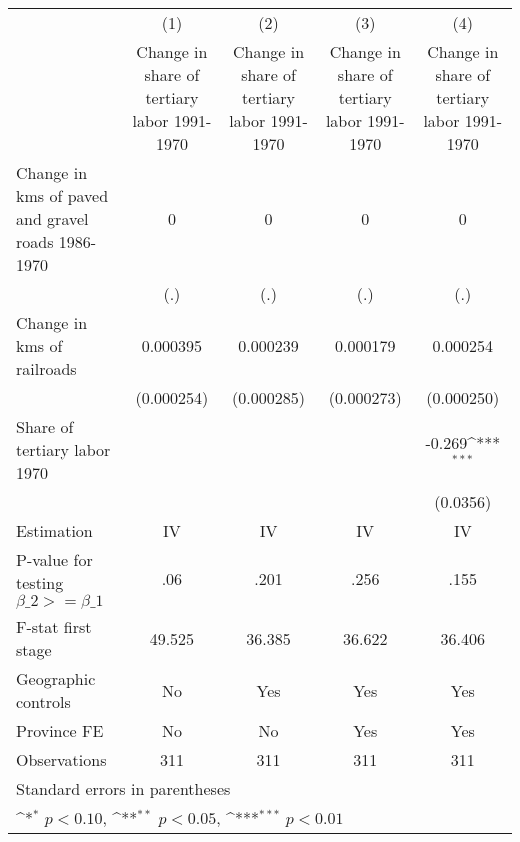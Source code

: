 {
\def\sym#1{\ifmmode^{#1}\else\(^{#1}\)\fi}
\begin{tabular}{l*{4}{c}}
\hline\hline
                    &\multicolumn{1}{c}{(1)}&\multicolumn{1}{c}{(2)}&\multicolumn{1}{c}{(3)}&\multicolumn{1}{c}{(4)}\\
                    &\multicolumn{1}{c}{Change in share of tertiary labor 1991-1970}&\multicolumn{1}{c}{Change in share of tertiary labor 1991-1970}&\multicolumn{1}{c}{Change in share of tertiary labor 1991-1970}&\multicolumn{1}{c}{Change in share of tertiary labor 1991-1970}\\
\hline
Change in kms of paved and gravel roads 1986-1970&           0         &           0         &           0         &           0         \\
                    &         (.)         &         (.)         &         (.)         &         (.)         \\
[1em]
Change in kms of railroads&    0.000395         &    0.000239         &    0.000179         &    0.000254         \\
                    &  (0.000254)         &  (0.000285)         &  (0.000273)         &  (0.000250)         \\
[1em]
Share of tertiary labor 1970&                     &                     &                     &      -0.269\sym{***}\\
                    &                     &                     &                     &    (0.0356)         \\
\hline
Estimation          &          IV         &          IV         &          IV         &          IV         \\
P-value for testing $\beta\_2 >= \beta\_1$&         .06         &        .201         &        .256         &        .155         \\
F-stat first stage  &      49.525         &      36.385         &      36.622         &      36.406         \\
Geographic controls &          No         &         Yes         &         Yes         &         Yes         \\
Province FE         &          No         &          No         &         Yes         &         Yes         \\
Observations        &         311         &         311         &         311         &         311         \\
\hline\hline
\multicolumn{5}{l}{\footnotesize Standard errors in parentheses}\\
\multicolumn{5}{l}{\footnotesize \sym{*} \(p<0.10\), \sym{**} \(p<0.05\), \sym{***} \(p<0.01\)}\\
\end{tabular}
}
